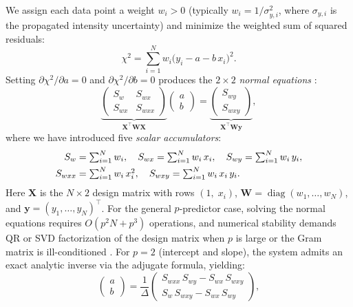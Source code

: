 We assign each data point a weight $w_i > 0$ (typically $w_i = 1/\sigma_{y,i}^2$, where $\sigma_{y,i}$ is the propagated intensity uncertainty) and minimize the weighted sum of squared residuals:
\begin{equation}
  \chi^2 = \sum_{i=1}^{N} w_i \bigl(y_i - a - b\, x_i\bigr)^2.
  \label{eq:boltzmann-chi2}
\end{equation}
Setting $\partial \chi^2 / \partial a = 0$ and $\partial \chi^2 / \partial b = 0$ produces the $2 \times 2$ \emph{normal equations} \citep[ch.~6]{Bevington2003}:
\begin{equation}
  \underbrace{
  \begin{pmatrix}
    S_w    & S_{wx} \\
    S_{wx} & S_{wxx}
  \end{pmatrix}}_{\displaystyle \bm{X}^\top \bm{W} \bm{X}}
  \begin{pmatrix} a \\ b \end{pmatrix}
  =
  \underbrace{
  \begin{pmatrix} S_{wy} \\ S_{wxy} \end{pmatrix}}_{\displaystyle \bm{X}^\top \bm{W} \bm{y}},
  \label{eq:normal-equations}
\end{equation}
where we have introduced five \emph{scalar accumulators}:
\begin{align}
  S_w    &= \textstyle\sum_{i=1}^{N} w_i, \quad
  S_{wx}  = \textstyle\sum_{i=1}^{N} w_i\, x_i, \quad
  S_{wy}  = \textstyle\sum_{i=1}^{N} w_i\, y_i, \notag\\
  S_{wxx} &= \textstyle\sum_{i=1}^{N} w_i\, x_i^2, \quad
  S_{wxy}  = \textstyle\sum_{i=1}^{N} w_i\, x_i\, y_i.
  \label{eq:boltzmann-sums}
\end{align}
Here $\bm{X}$ is the $N \times 2$ design matrix with rows $(1,\; x_i)$, $\bm{W} = \operatorname{diag}(w_1,\ldots,w_N)$, and $\bm{y} = (y_1,\ldots,y_N)^\top$.
For the general $p$-predictor case, solving the normal equations requires $O(p^2 N + p^3)$ operations, and numerical stability demands QR or SVD factorization of the design matrix when $p$ is large or the Gram matrix is ill-conditioned \citep[ch.~15]{Press2007}.
For $p = 2$ (intercept and slope), the system admits an exact analytic inverse via the adjugate formula, yielding:
\begin{equation}
  \begin{pmatrix} a \\ b \end{pmatrix}
  = \frac{1}{\Delta}
  \begin{pmatrix}
    S_{wxx}\, S_{wy} - S_{wx}\, S_{wxy} \\
    S_w\, S_{wxy} - S_{wx}\, S_{wy}
  \end{pmatrix},
  \label{eq:boltzmann-slope}
\end{equation}
